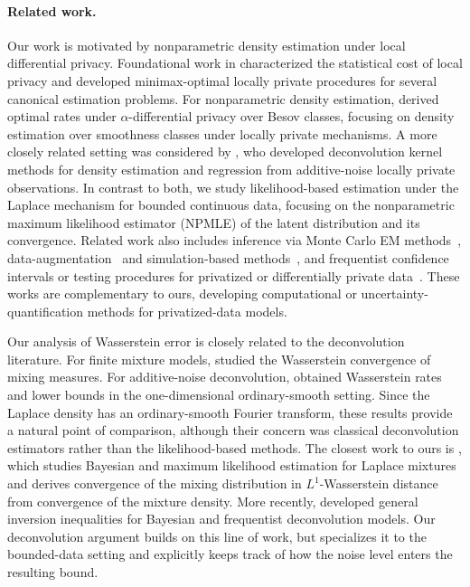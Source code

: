 \documentclass[english, 11pt]{article}
\theoremstyle{plain}
\theoremstyle{definition}
\theoremstyle{remark}
\begin{document}
\paragraph{Related work.} Our work is motivated by nonparametric density estimation under local differential privacy.
Foundational work in \cite{duchi2013local,duchi2018minimax} characterized the statistical cost of local privacy and developed minimax-optimal locally private procedures for several canonical estimation problems.
For nonparametric density estimation, \cite{19-BEJ1165} derived optimal rates under $\alpha$-differential privacy over Besov classes, focusing on density estimation over smoothness classes under locally private mechanisms.
A more closely related setting was considered by \cite{farokhi2020deconvoluting}, who developed deconvolution kernel methods for density estimation and regression from additive-noise locally private observations.
In contrast to both, we study likelihood-based estimation under the Laplace mechanism for bounded continuous data, focusing on the nonparametric maximum likelihood estimator (NPMLE) of the latent distribution and its convergence. 
Related work %
also includes inference via Monte Carlo EM methods~\citep{gong2022exact}, data-augmentation~\citep{ju2022data,xiong2025soma} and simulation-based methods~\citep{awan2025simulation,xiong2025simulation}, and frequentist confidence intervals or testing procedures for privatized or differentially private data~\citep{ferrando2022parametric,karwa2016inference,karwa2017finite}.
These works are complementary to ours, developing computational or uncertainty-quantification methods for privatized-data models. %

Our analysis of Wasserstein error is closely related to the deconvolution literature. %
For finite mixture models, \cite{nguyen2013convergence} studied the Wasserstein convergence of mixing measures.
For additive-noise deconvolution, \cite{dedecker2015improved} obtained Wasserstein rates and lower bounds in the one-dimensional ordinary-smooth setting. %
Since the Laplace density has an ordinary-smooth Fourier transform, these results provide a natural point of comparison, although their concern was %
classical deconvolution estimators rather than the likelihood-based methods.
The closest work to ours is \cite{scricciolo2018bayes}, which studies Bayesian and maximum likelihood estimation for Laplace mixtures and derives convergence of the mixing distribution in $L^1$-Wasserstein distance from convergence of the mixture density. %
More recently, \cite{rousseau2024wasserstein} developed general inversion inequalities for Bayesian and frequentist deconvolution models.
Our deconvolution argument builds on this line of work, but specializes it to the bounded-data setting and explicitly keeps track of how the noise level enters the resulting bound.
\end{document}
